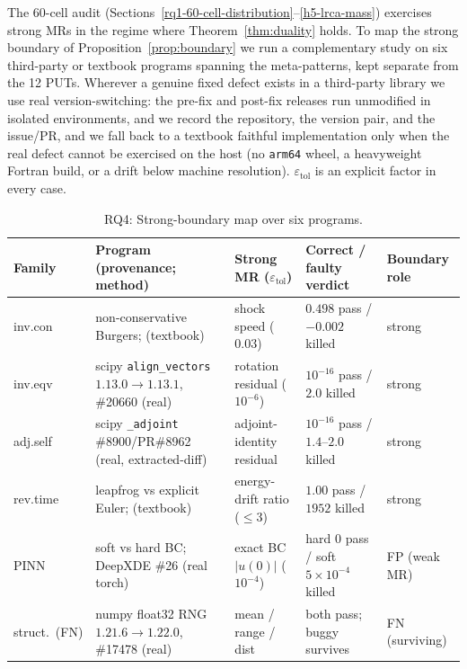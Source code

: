 \documentclass[manuscript,screen,review]{acmart}
\begin{document}
The 60-cell audit (Sections~\ref{rq1-60-cell-distribution}--\ref{h5-lrca-mass}) exercises strong MRs in the regime where
Theorem~\ref{thm:duality} holds. To map the strong boundary of Proposition~\ref{prop:boundary} we run a
complementary study on six third-party or textbook programs spanning the
meta-patterns, kept separate from the 12 PUTs. Wherever a genuine fixed
defect exists in a third-party library we use real version-switching:
the pre-fix and post-fix releases run unmodified in isolated environments,
and we record the repository, the version pair, and the issue/PR, and
we fall back to a textbook faithful implementation only when the real
defect cannot be exercised on the host (no \texttt{arm64} wheel, a
heavyweight Fortran build, or a drift below machine resolution).
$\varepsilon_{\mathrm{tol}}$ is an explicit factor in every case.

{%
\begin{longtable}[]{@{}p{1.6cm}p{3.4cm}p{2.5cm}p{2.6cm}p{1.7cm}@{}}
\caption{RQ4: Strong-boundary map over six programs.}\label{tab:p2-30}\\
\toprule\noalign{}
Family & Program (provenance; method) & Strong MR ($\varepsilon_{\mathrm{tol}}$) & Correct / faulty verdict & Boundary role \\
\midrule\noalign{}
\endfirsthead
\endhead
\bottomrule\noalign{}
\endlastfoot
inv.con & non-conservative Burgers; \citep{hou1994nonconservative} (textbook) & shock speed ($0.03$) & $0.498$ pass / $-0.002$ killed & strong \\
inv.eqv & scipy \texttt{align\_vectors} $1.13.0\to1.13.1$, \#20660 (real) & rotation residual ($10^{-6}$) & $10^{-16}$ pass / $2.0$ killed & strong \\
adj.self & scipy \texttt{\_adjoint} \#8900/PR\#8962 (real, extracted-diff) & adjoint-identity residual & $10^{-16}$ pass / $1.4$--$2.0$ killed & strong \\
rev.time & leapfrog vs explicit Euler; \citep{hairer2006geometric} (textbook) & energy-drift ratio ($\leq 3$) & $1.00$ pass / $1952$ killed & strong \\
PINN & soft vs hard BC; DeepXDE \#26 (real torch) & exact BC $|u(0)|$ ($10^{-4}$) & hard $0$ pass / soft $5\times10^{-4}$ killed & FP (weak MR) \\
struct.\ (FN) & numpy float32 RNG $1.21.6\to1.22.0$, \#17478 (real) & mean / range / dist & both pass; buggy survives & FN (surviving) \\
\end{longtable}
}
\end{document}
